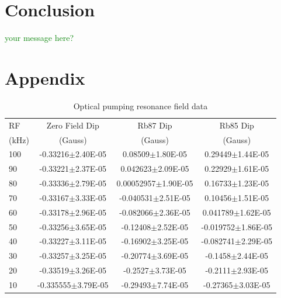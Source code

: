 \documentclass[prb,preprint]{revtex4-1}
\begin{document}
\section{Conclusion}

\textcolor{green}{your message here?}


\section{Appendix}
\begin{table}[h]
\centering
\caption{Optical pumping resonance field data}
\begin{ruledtabular}
\begin{tabular}{ l c c c}
RF & Zero Field Dip & Rb87 Dip & Rb85 Dip\\
(kHz) & (Gauss) & (Gauss) & (Gauss)\\
\hline
100	& -0.33216$\pm$2.40E-05 & 0.08509$\pm$1.80E-05 & 0.29449$\pm$1.44E-05\\
90&-0.33221$\pm$2.37E-05&0.042623$\pm$2.09E-05&0.22929$\pm$1.61E-05\\
80&-0.33336$\pm$2.79E-05&0.00052957$\pm$1.90E-05&0.16733$\pm$1.23E-05\\
70&-0.33167$\pm$3.33E-05&-0.040531$\pm$2.51E-05&0.10456$\pm$1.51E-05\\
60&-0.33178$\pm$2.96E-05&-0.082066$\pm$2.36E-05&0.041789$\pm$1.62E-05\\
50&-0.33256$\pm$3.65E-05&-0.12408$\pm$2.52E-05&-0.019752$\pm$1.86E-05\\
40&-0.33227$\pm$3.11E-05&-0.16902$\pm$3.25E-05&-0.082741$\pm$2.29E-05\\
30&-0.33257$\pm$3.25E-05&-0.20774$\pm$3.69E-05&-0.1458$\pm$2.44E-05	\\
20&-0.33519$\pm$3.26E-05&-0.2527$\pm$3.73E-05&-0.2111$\pm$2.93E-05\\
10	&-0.335555$\pm$3.79E-05&-0.29493$\pm$7.74E-05&-0.27365$\pm$3.03E-05\\
\end{tabular}
\end{ruledtabular}
\label{data}
\end{table}
\end{document}
